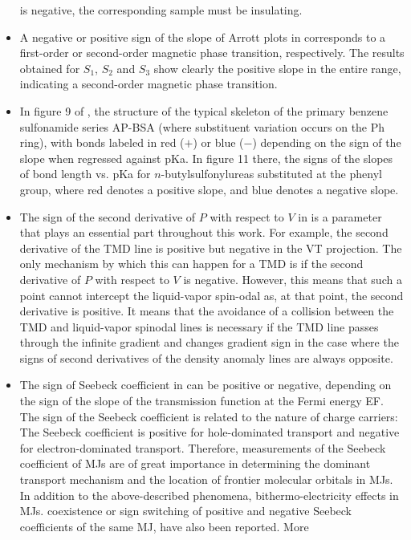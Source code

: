 \documentclass[11pt]{book}
\begin{document}
\begin{itemize}
is negative, the corresponding sample must be insulating.
\item A negative or positive sign of the slope of Arrott plots in \cite{estemirova2018structural}
corresponds to a first-order or second-order magnetic phase transition,
respectively. The results obtained for $S_{1}$, $S_{2}$ and $S_{3}$
show clearly the positive slope in the entire range, indicating a
second-order magnetic phase transition.
\item In figure 9 of \cite{caine2019experiment},
the structure of the typical skeleton of the primary benzene sulfonamide
series AP-BSA (where substituent variation occurs on the Ph ring),
with bonds labeled in red ($+$) or blue ($-$) depending on the sign
of the slope when regressed against pKa. In figure 11 there, the signs
of the slopes of bond length vs. pKa for $n$-butylsulfonylureas substituted
at the phenyl group, where red denotes a positive slope, and blue
denotes a negative slope.
\item The sign of the second derivative of $P$ with respect to $V$ in
\cite{fijan2019interactions} is a
parameter that plays an essential part throughout this work. For example,
the second derivative of the TMD line is positive but negative in
the VT projection. The only mechanism by which this can happen for
a TMD is if the second derivative of $P$ with respect to $V$ is
negative. However, this means that such a point cannot intercept the
liquid-vapor spin-odal as, at that point, the second derivative is
positive. It means that the avoidance of a collision between the TMD
and liquid-vapor spinodal lines is necessary if the TMD line passes
through the infinite gradient and changes gradient sign in the case
where the signs of second derivatives of the density anomaly lines
are always opposite.
\item The sign of Seebeck coefficient in \cite{wang2020thermal}
can be positive or negative, depending on the sign of the slope of
the transmission function at the Fermi energy EF. The sign of the
Seebeck coefficient is related to the nature of charge carriers: The
Seebeck coefficient is positive for hole-dominated transport and negative
for electron-dominated transport. Therefore, measurements of the Seebeck
coefficient of MJs are of great importance in determining the dominant
transport mechanism and the location of frontier molecular orbitals
in MJs. In addition to the above-described phenomena, bithermo-electricity
effects in MJs. coexistence or sign switching of positive and negative
Seebeck coefficients of the same MJ, have also been reported. More

\end{itemize}
\end{document}
